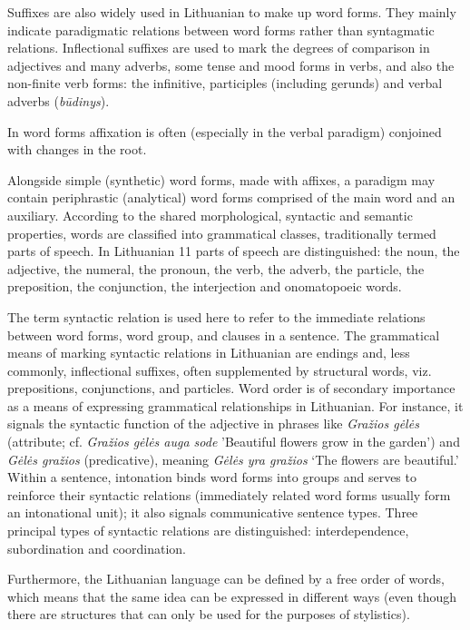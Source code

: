 \documentclass[]{../metanetpaper}
\begin{document}
\begin{multicols}{2}
    Suffixes are also widely used in Lithuanian to make up word forms. They mainly indicate paradigmatic relations between word forms rather than syntagmatic relations. Inflectional suffixes are used to mark the degrees of comparison in adjectives and many adverbs, some tense and mood forms in verbs, and also the non-finite verb forms: the infinitive, participles (including gerunds) and verbal adverbs (\textit{būdinys}). 

    In word forms affixation is often (especially in the verbal paradigm) conjoined with changes in the root. 


Alongside simple (synthetic) word forms, made with affixes, a paradigm may contain periphrastic (analytical) word forms comprised of the main word and an auxiliary.
    According to the shared morphological, syntactic and semantic properties, words are classified into grammatical classes, traditionally termed parts of speech. In Lithuanian 11 parts of speech are distinguished: the noun, the adjective, the numeral, the pronoun, the verb, the adverb, the particle, the preposition, the conjunction, the interjection and onomatopoeic words.

    The term syntactic relation is used here to refer to the immediate relations between word forms, word group, and clauses in a sentence. The grammatical means of marking syntactic relations in Lithuanian are endings and, less commonly, inflectional suffixes, often supplemented by structural words, viz. prepositions, conjunctions, and particles. Word order is of secondary importance as a means of expressing grammatical relationships in Lithuanian. For instance, it signals the syntactic function of the adjective in phrases like \textit{Gražios gėlės} (attribute; cf. \textit{Gražios gėlės auga sode} 'Beautiful flowers grow in the garden') and \textit{Gėlės gražios} (predicative), meaning \textit{Gėlės yra gražios} ‘The flowers are beautiful.' Within a sentence, intonation binds word forms into groups and serves to reinforce their syntactic relations (immediately related word forms usually form an intonational unit); it also signals communicative sentence types. Three principal types of syntactic relations are distinguished: interdependence, subordination and coordination.

    Furthermore, the Lithuanian language can be defined by a free order of words, which means that the same idea can be expressed in different ways (even though there are structures that can only be used for the purposes of stylistics).


\end{multicols}
\end{document}

